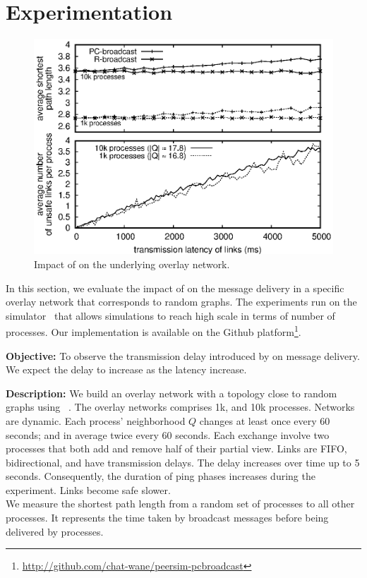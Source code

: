 
\section{Experimentation}
\label{sec:experimentation}


\begin{figure}
  \begin{center}
    \includegraphics[width=1.5\columnwidth]{./img/delay.eps}
    \caption{\label{fig:delay}Impact of \CBROADCAST on the underlying overlay
      network.}
  \end{center}
\end{figure}


In this section, we evaluate the impact of \CBROADCAST on the message delivery
in a specific overlay network that corresponds to random graphs. The experiments
run on the \PEERSIM simulator~\cite{montresor2009peersim} that allows
simulations to reach high scale in terms of number of processes. Our
implementation is available on the Github
platform\footnote{\url{http://github.com/chat-wane/peersim-pcbroadcast}}.


\noindent \textbf{Objective:} To observe the transmission delay introduced by
\CBROADCAST on message delivery. We expect the delay to increase as the latency
increase.

\noindent \textbf{Description:} We build an overlay network with a topology
close to random graphs using \SPRAY~\cite{nedelec2017adaptive}. The overlay
networks comprises 1k, and 10k processes. Networks are dynamic. Each process'
neighborhood $Q$ changes at least once every 60 seconds; and in average twice
every 60 seconds. Each exchange involve two processes that both add and remove
half of their partial view.  Links are FIFO, bidirectional, and have
transmission delays. The delay increases over time up to 5 seconds.
Consequently, the duration of ping phases increases during the experiment.
Links become safe slower. \\
We measure the shortest path length from a random set of processes to all other
processes. It represents the time taken by broadcast messages before being
delivered by processes.


